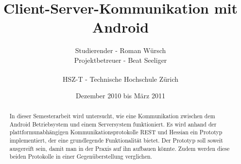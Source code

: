 \documentclass[abstracton, listof=totocnumbered,
bibliography=totocnumbered]{scrreprt}
\title{Client-Server-Kommunikation mit Android}
\author{Studierender - Roman Würsch\\
	Projektbetreuer - Beat Seeliger\\
	\\
	HSZ-T - Technische Hochschule Zürich}
\date{Dezember 2010 bis März 2011}
\begin{document}
  \ifpdf
  \else
  \fi
  
  
  \maketitle
  
  
  
  \begin{abstract}
    In dieser Semesterarbeit wird untersucht, wie eine Kommunikation zwischen
    dem Android Betriebsystem und einem Serversystem funktioniert. Es wird
    anhand der plattformunabhängigen Kommunikationsprotokolle REST und Hessian
    ein Prototyp implementiert, der eine grundlegende Funktionalität bietet. Der
    Prototyp soll soweit ausgereift sein, damit man in der Praxis auf ihn
    aufbauen könnte.
    Zudem werden diese beiden Protokolle in einer Gegenüberstellung verglichen.
  \end{abstract}
  

  
  \tableofcontents
  
  \clearpage
  
  
  
  
\end{document}
